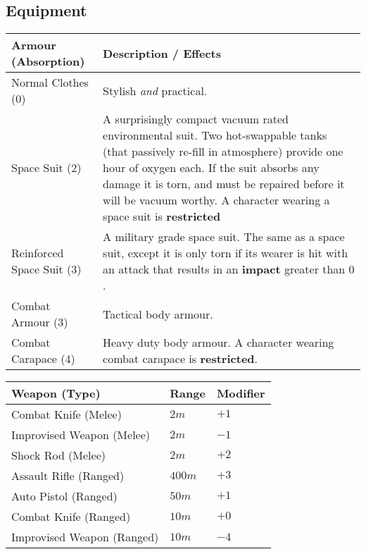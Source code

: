 \documentclass[11pt]{article}
\begin{document}
\begin{multicols}{3}
  \subsection*{Equipment}

  \begin{tabularx}{\linewidth}{lX}
    Armour (Absorption) & Description / Effects \\
    \hline
    Normal Clothes (0) & Stylish \textit{and} practical. \\
    Space Suit (2) & A surprisingly compact vacuum rated environmental suit. Two hot-swappable tanks (that passively re-fill in atmosphere) provide one hour of oxygen each. If the suit absorbs any damage it is torn, and must be repaired before it will be vacuum worthy. A character wearing a space suit is \textbf{restricted} \\
    Reinforced Space Suit (3) & A military grade space suit. The same as a space suit, except it is only torn if its wearer is hit with an attack that results in an \textbf{impact} greater than $0$. \\
    Combat Armour (3) & Tactical body armour. \\
    Combat Carapace (4) & Heavy duty body armour. A character wearing combat carapace is \textbf{restricted}.
  \end{tabularx}

  \begin{tabularx}{\linewidth}{lXX}
    Weapon (Type) & Range & Modifier \\
    \hline
    Combat Knife (Melee) & $2m$ & $+1$ \\
    Improvised Weapon (Melee) & $2m$ & $-1$ \\
    Shock Rod (Melee) & $2m$ & $+2$ \\
    Assault Rifle (Ranged) & $400m$ & $+3$ \\
    Auto Pistol (Ranged) & $50m$ & $+1$ \\
    Combat Knife (Ranged) & $10m$ & $+0$ \\
    Improvised Weapon (Ranged) & $10m$ & $-4$
  \end{tabularx}


\end{multicols}
\end{document}

